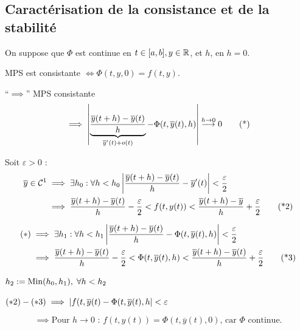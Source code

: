 \subsection{Caractérisation de la consistance et de la stabilité}

On suppose que $\Phi$ est continue en $t\in[a,b], y \in \mathbb{R}$, et $h$, en $h=0$.

\begin{prop}
    MPS est consistante $\iff \Phi(t,y,0) = f(t,y)$.
\end{prop}

\begin{preuve}
    ``$\implies$'' MPS consistante 
    \begin{equation}
        \implies \left\lvert\underbrace{\frac{\overline{y}(t+h) - \overline{y}(t)}{h}}_{\overline{y}'(t) + o(t)}
        - \Phi(t,\overline{y}(t),h)\right\rvert \overset{h\to0}{\longrightarrow} 0
        \tag{*}
    \end{equation}

    Soit $\varepsilon > 0$ :
        \begin{align}
            \overline{y} \in \mathcal{C}^1 & \implies \exists h_0 : \forall h < h_0
            \left\lvert\frac{\overline{y}(t+h)-\overline{y}(t)}{h} - \overline{y}'(t)\right\rvert < \frac{\varepsilon}{2}
            \notag
            \\
            & \implies \frac{\overline{y}(t+h) - \overline{y}(t)}{h} - \frac{\varepsilon}{2} < f(t,y(t)) < \frac{\overline{y}(t+h) - \overline{y}}{h} + \frac{\varepsilon}{2}
            \tag{*2}
        \end{align}

        \begin{align}
            (*) & \implies \exists h_1 : \forall h < h_1 \left\lvert\frac{\overline{y}(t+h) - \overline{y}(t)}{h} - \Phi(t,\overline{y}(t),h)\right\rvert < \frac{\varepsilon}{2}
            \notag
            \\
            & \implies \frac{\overline{y}(t+h) - \overline{y}(t)}{h} - \frac{\varepsilon}{2} < \Phi(t,\overline{y}(t),h) < \frac{\overline{y}(t+h) - \overline{y}(t)}{h} + \frac{\varepsilon}{2}
            \tag{*3}
        \end{align}

        \vspace{0.5cm}
        $h_2 := \operatorname{Min}(h_0,h_1), \; \forall h < h_2$

        $(*2) - (*3) \implies \left\lvert f(t,\overline{y}(t) - \Phi(t,\overline{y}(t),h\right\rvert < \varepsilon$

        \begin{equation}
            \implies \text{Pour $h \to 0$ : $f(t,y(t)) = \Phi(t,\overline{y}(t),0)$, car $\Phi$ continue.}
            \tag{*4}
        \end{equation}


\end{preuve}
